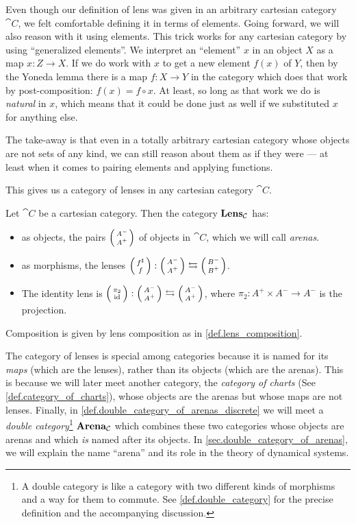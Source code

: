\documentclass[DynamicalBook]{subfiles}
\begin{document}
\begin{remark}\label{rmk.generalized_elements}
  Even though our definition of lens was given in an arbitrary cartesian
  category $\cat{C}$, we felt comfortable defining it in terms of elements.
  Going forward, we will also reason with it using elements. This trick works for any cartesian category by using
  ``generalized elements''. We interpret an ``element'' $x$ in an object $X$ as
  a map $x : Z \to X$. If we do work with $x$ to get a new element $f(x)$ of
  $Y$, then by the Yoneda lemma there is a map $f : X \to Y$ in
  the category which does that work by post-composition: $f(x) = f \circ x$. At least, so long as that work we do is \emph{natural} in $x$, which means that it could be done just as well if we substituted $x$ for anything else.

  The take-away is that even in a totally arbitrary cartesian category whose
  objects are not sets of any kind, we can still reason about them as if they
  were --- at least when it comes to pairing elements and applying functions.
\end{remark}

This gives us a category of lenses in any cartesian category $\cat{C}$.

\begin{definition}\label{def.lens_category}
Let $\cat{C}$ be a cartesian category. Then the category $\textbf{Lens}_{\mathcal{C}}$
has:
\begin{itemize}
\item as objects, the pairs $\lens{A^-}{A^+}$ of objects in $\cat{C}$, which we will
  call \emph{arenas}.
\item as morphisms, the lenses $\lens{f^{\sharp}}{f} : \lens{A^-}{A^+} \leftrightarrows \lens{B^-}{B^+}$.
\item The identity lens is $\lens{\pi_2}{\id} : \lens{A^-}{A^+} \leftrightarrows
  \lens{A^-}{A^+}$, where $\pi_2 : A^+ \times A^- \to A^-$ is the projection.
\end{itemize}
\item Composition is given by lens composition as in \cref{def.lens_composition}.
\end{definition}


\begin{remark}
  The category of lenses is special among categories because it is named for its
  \emph{maps} (which are the lenses), rather than its objects (which are the
  arenas). This is because we will later meet another category, the
  \emph{category of charts} (See \cref{def.category_of_charts}), whose objects are
  the arenas but whose maps are not lenses. Finally, in
  \cref{def.double_category_of_arenas_discrete} we will meet a \emph{double
    category}\footnote{A double category is like a category with two different
    kinds of morphisms and a way for them to commute. See
    \cref{def.double_category} for the precise definition and the accompanying
    discussion.} $\textbf{Arena}_{\mathcal{C}}$ which combines these two categories whose objects
  are arenas and which \emph{is} named after its objects. In
  \cref{sec.double_category_of_arenas}, we will explain the name ``arena'' and
  its role in the theory of dynamical systems.
\end{remark}
\end{document}
